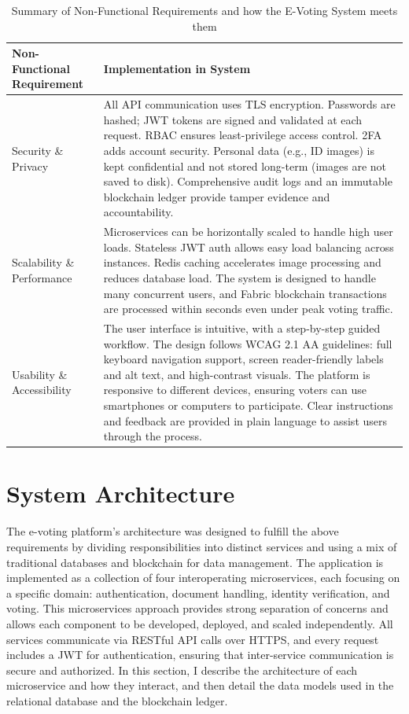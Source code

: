 \documentclass[a4paper,10pt]{report}
\begin{document}
\begin{table}[h!]\centering
\begin{tabular}{p{4cm} p{11cm}}
\hline
\textbf{Non-Functional Requirement} & \textbf{Implementation in System} \\
\hline
Security \& Privacy & All API communication uses TLS encryption. Passwords are hashed; JWT tokens are signed and validated at each request. RBAC ensures least-privilege access control. 2FA adds account security. Personal data (e.g., ID images) is kept confidential and not stored long-term (images are not saved to disk). Comprehensive audit logs and an immutable blockchain ledger provide tamper evidence and accountability. \\[1ex]
Scalability \& Performance & Microservices can be horizontally scaled to handle high user loads. Stateless JWT auth allows easy load balancing across instances. Redis caching accelerates image processing and reduces database load. The system is designed to handle many concurrent users, and Fabric blockchain transactions are processed within seconds even under peak voting traffic. \\[1ex]
Usability \& Accessibility & The user interface is intuitive, with a step-by-step guided workflow. The design follows WCAG 2.1 AA guidelines: full keyboard navigation support, screen reader-friendly labels and alt text, and high-contrast visuals. The platform is responsive to different devices, ensuring voters can use smartphones or computers to participate. Clear instructions and feedback are provided in plain language to assist users through the process. \\
\hline
\end{tabular}
\caption{Summary of Non-Functional Requirements and how the E-Voting System meets them}
\end{table}

\section{System Architecture}
The e-voting platform’s architecture was designed to fulfill the above requirements by dividing responsibilities into distinct services and using a mix of traditional databases and blockchain for data management. The application is implemented as a collection of four interoperating microservices, each focusing on a specific domain: authentication, document handling, identity verification, and voting. This microservices approach provides strong separation of concerns and allows each component to be developed, deployed, and scaled independently. All services communicate via RESTful API calls over HTTPS, and every request includes a JWT for authentication, ensuring that inter-service communication is secure and authorized. In this section, I describe the architecture of each microservice and how they interact, and then detail the data models used in the relational database and the blockchain ledger.
\end{document}
